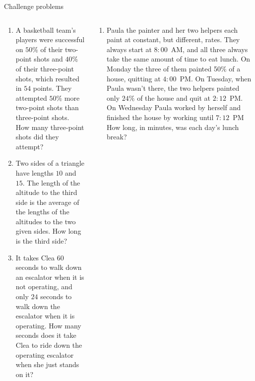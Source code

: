 \documentclass[9pt,aspectratio=169]{beamer}
\begin{document}
\begin{frame}{Challenge problems}
  \begin{columns}[T]
    \begin{column}{0.5\textwidth}
      \begin{enumerate}
        \item A basketball team's players were successful on $50\%$ of their two-point shots and $40\%$ of their three-point shots, which resulted in $54$ points. They attempted $50\%$ more two-point shots than three-point shots. How many three-point shots did they attempt?
        \item Two sides of a triangle have lengths $10$ and $15$. The length of the altitude to the third side is the average of the lengths of the altitudes to the two given sides. How long is the third side?
        \item It takes Clea $60$ seconds to walk down an escalator when it is not operating, and only $24$ seconds to walk down the escalator when it is operating. How many seconds does it take Clea to ride down the operating escalator when she just stands on it?
        \seti
      \end{enumerate}
    \end{column}
    \begin{column}{0.5\textwidth}
      \begin{enumerate}
        \conti
        \item Paula the painter and her two helpers each paint at constant, but different, rates. They always start at $8{:}00$~AM, and all three always take the same amount of time to eat lunch. On Monday the three of them painted 5$0\%$ of a house, quitting at $4{:}00$~PM. On Tuesday, when Paula wasn't there, the two helpers painted only $24\%$ of the house and quit at $2{:}12$~PM. On Wednesday Paula worked by herself and finished the house by working until $7{:}12$~PM How long, in minutes, was each day's lunch break?
      \end{enumerate}
    \end{column}
  \end{columns}
\end{frame}

\end{document}
